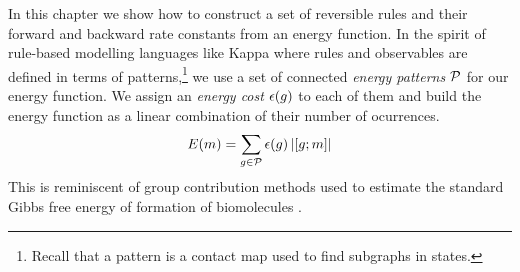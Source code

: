 In this chapter we show how to construct a set of reversible rules
and their forward and backward rate constants from an energy function.
In the spirit of rule-based modelling languages like Kappa
where rules and observables are defined in terms of patterns,\footnote{
  Recall that a pattern is a contact map used to find subgraphs in states.}
we use a set of connected \emph{energy patterns} $\mathcal{P}$
for our energy function.
We assign an \emph{energy cost} $\epsilon(g)$ to each of them
and build the energy function as a linear combination
of their number of ocurrences. %
\begin{equation}
  \label{eq:graph-energy}
  E(m) = \sum_{g \in \mathcal{P}} \epsilon(g) \left\lvert \left[g;m\right] \right\rvert
\end{equation}
This is reminiscent of group contribution methods
used to estimate the standard Gibbs free energy of formation
of biomolecules \citep{group-contrib}.

